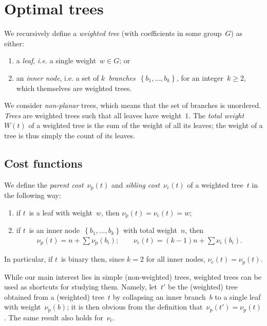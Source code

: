 \documentclass{article}
\def\pcost{ν_\mathrm{p}}
\def\scost{ν_\mathrm{c}}
\def\treefrom#1{\left\{#1\right\}}
\begin{document}
\section{Optimal trees}


\begin{df}
We recursively define a \emph{weighted tree} (with coefficients in some
group~$G$) as either:
\begin{enumerate}
\item a \emph{leaf}, \emph{i.e.} a single weight~$w ∈ G$; or
\item an \emph{inner node}, i.e. a set of
$k$~\emph{branches}~$\treefrom{b_1, …, b_k}$, for an integer~$k ≥ 2$,
which themselves are weighted trees.
\end{enumerate}
\end{df}

We consider \emph{non-planar} trees,
which means that the set of branches is unordered.
\emph{Trees} are weighted trees such that all leaves have weight~$1$.
The \emph{total weight}~$W(t)$ of a weighted tree is
the sum of the weight of all its leaves;
the weight of a tree is thus simply the count of its leaves.


\subsection{Cost functions}

\begin{df}
We define the \emph{parent cost}~$\pcost(t)$ 
and \emph{sibling cost}~$\scost(t)$
of a weighted tree~$t$ in the following way:
\begin{enumerate}
\item if $t$~is a leaf with weight~$w$,
then $\pcost(t) = \scost(t) = w$;
\item if $t$~is an inner node~$\treefrom{b_1, …, b_k}$
with total weight~$n$,
then
\begin{align}
\pcost(t) = n + ∑ \pcost(b_i); \qquad
\scost(t) = (k-1) n + ∑ \scost(b_i).
\end{align}
\end{enumerate}
\end{df}
In particular, if $t$~is binary then, since $k = 2$ for all inner nodes,
$\scost(t) = \pcost(t)$.

While our main interest lies in simple (non-weighted) trees,
weighted trees can be used as shortcuts for studying them.
Namely, let~$t'$ be the (weighted) tree obtained from a (weighted) tree~$t$
by collapsing an inner branch~$b$ to a single leaf
with weight~$\pcost(b)$;
it is then obvious from the definition that~$\pcost(t') = \pcost(t)$.
The same result also holds for~$\scost$.
\end{document}
